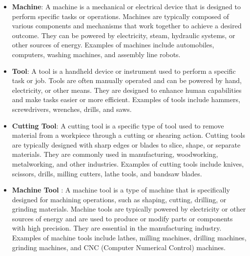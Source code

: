 \documentclass{article}
\begin{document}
\begin{itemize}  
  \item \textbf{Machine}: A machine is a mechanical or electrical device that is designed to perform specific tasks or operations. Machines are typically composed of various components and mechanisms that work together to achieve a desired outcome. They can be powered by electricity, steam, hydraulic systems, or other sources of energy. Examples of machines include automobiles, computers, washing machines, and assembly line robots.

  \item \textbf{Tool}: A tool is a handheld device or instrument used to perform a specific task or job. Tools are often manually operated and can be powered by hand, electricity, or other means. They are designed to enhance human capabilities and make tasks easier or more efficient. Examples of tools include hammers, screwdrivers, wrenches, drills, and saws.
  
  \item \textbf{Cutting Tool}: A cutting tool is a specific type of tool used to remove material from a workpiece through a cutting or shearing action. Cutting tools are typically designed with sharp edges or blades to slice, shape, or separate materials. They are commonly used in manufacturing, woodworking, metalworking, and other industries. Examples of cutting tools include knives, scissors, drills, milling cutters, lathe tools, and bandsaw blades.
  
  \item \textbf{Machine Tool} : A machine tool is a type of machine that is specifically designed for machining operations, such as shaping, cutting, drilling, or grinding materials. Machine tools are typically powered by electricity or other sources of energy and are used to produce or modify parts or components with high precision. They are essential in the manufacturing industry. Examples of machine tools include lathes, milling machines, drilling machines, grinding machines, and CNC (Computer Numerical Control) machines.
\end{itemize}
\end{document}
